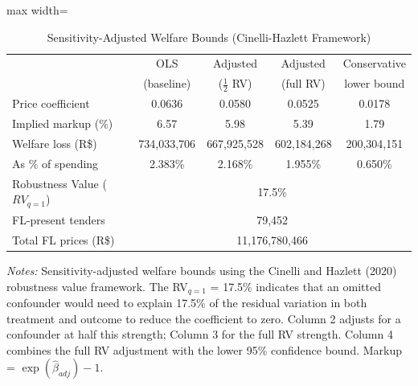 \begin{table}[htbp]
\centering
\caption{Sensitivity-Adjusted Welfare Bounds (Cinelli-Hazlett Framework)}
\label{tab:welfare_adjusted}
\begin{adjustbox}{max width=\textwidth}
\begin{threeparttable}
\small
\begin{tabular}{lcccc}
\toprule
 & OLS & Adjusted & Adjusted & Conservative \\
 & (baseline) & ($\frac{1}{2}$ RV) & (full RV) & lower bound \\
\midrule
Price coefficient & 0.0636 & 0.0580 & 0.0525 & 0.0178 \\
Implied markup (\%) & 6.57 & 5.98 & 5.39 & 1.79 \\
Welfare loss (R\$) & 734,033,706 & 667,925,528 & 602,184,268 & 200,304,151 \\
As \% of spending & 2.383\% & 2.168\% & 1.955\% & 0.650\% \\
\midrule
Robustness Value ($RV_{q=1}$) & \multicolumn{4}{c}{17.5\%} \\
FL-present tenders & \multicolumn{4}{c}{79,452} \\
Total FL prices (R\$) & \multicolumn{4}{c}{11,176,780,466} \\
\bottomrule
\end{tabular}
\begin{tablenotes}
\small
\item \textit{Notes:} Sensitivity-adjusted welfare bounds using the Cinelli and Hazlett (2020)
robustness value framework. The RV$_{q=1}$ = 17.5\% indicates that an omitted confounder
would need to explain 17.5\% of the residual variation in both treatment and outcome to
reduce the coefficient to zero. Column 2 adjusts for a confounder at half this strength;
Column 3 for the full RV strength. Column 4 combines the full RV adjustment with the
lower 95\% confidence bound. Markup = $\exp(\hat{\beta}_{adj}) - 1$.
\end{tablenotes}
\end{threeparttable}
\end{adjustbox}
\end{table}
